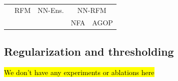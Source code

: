 \begin{table}[htb]

    \begin{tabular}{l|ll|ll}
        \toprule
         & RFM & NN-Ens. & \multicolumn{2}{c}{NN-RFM} \\
         &      & & NFA & AGOP \\
        \midrule
        \bottomrule
    \end{tabular}

\end{table}







\subsection{Regularization and thresholding}
\hl{We don't have any experiments or ablations here}